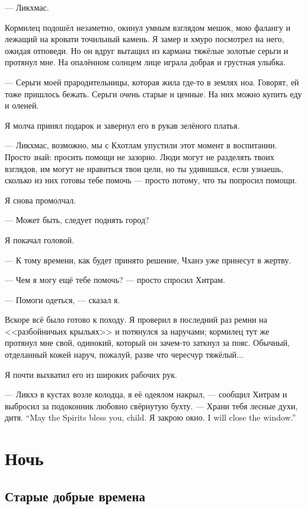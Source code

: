 --- Ликхмас.

Кормилец подошёл незаметно, окинул умным взглядом мешок, мою фалангу и лежащий на кровати точильный камень.
Я замер и хмуро посмотрел на него, ожидая отповеди.
Но он вдруг вытащил из кармана тяжёлые золотые серьги и протянул мне.
На опалённом солнцем лице играла добрая и грустная улыбка.

--- Серьги моей прародительницы, которая жила где-то в землях ноа.
Говорят, ей тоже пришлось бежать.
Серьги очень старые и ценные.
На них можно купить еду и оленей.

Я молча принял подарок и завернул его в рукав зелёного платья.

--- Ликхмас, возможно, мы с Кхотлам упустили этот момент в воспитании.
Просто знай: просить помощи не зазорно.
Люди могут не разделять твоих взглядов, им могут не нравиться твои цели, но ты удивишься, если узнаешь, сколько из них готовы тебе помочь --- просто потому, что ты попросил помощи.

Я снова промолчал.

--- Может быть, следует поднять город?

Я покачал головой.

--- К тому времени, как будет принято решение, Чханэ уже принесут в жертву.

--- Чем я могу ещё тебе помочь? --- просто спросил Хитрам.

--- Помоги одеться, --- сказал я.

Вскоре всё было готово к походу.
Я проверил в последний раз ремни на <<разбойничьих крыльях>> и потянулся за наручами;
кормилец тут же протянул мне свой, одинокий, который он зачем-то заткнул за пояс.
Обычный, отделанный кожей наруч, пожалуй, разве что чересчур тяжёлый...

Я почти выхватил его из широких рабочих рук.

--- Ликхэ в кустах возле колодца, я её одеялом накрыл, --- сообщил Хитрам и выбросил за подоконник любовно свёрнутую бухту.
{--- Храни тебя лесные духи, дитя.}
{``May the Spirits bless you, child.}
{Я закрою окно.}
{I will close the window.''}

\chapter{Ночь}

\section{Старые добрые времена}

